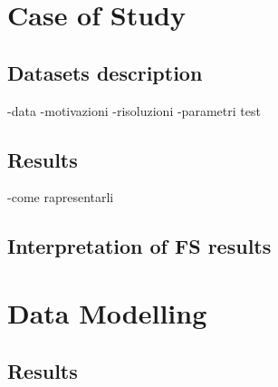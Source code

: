 \section{Case of Study}
\subsection{Datasets description}
-data
-motivazioni
-risoluzioni
-parametri test
\subsection{Results}
-come rapresentarli
\subsection{Interpretation of FS results}
\section{Data Modelling}
\subsection{Results}
